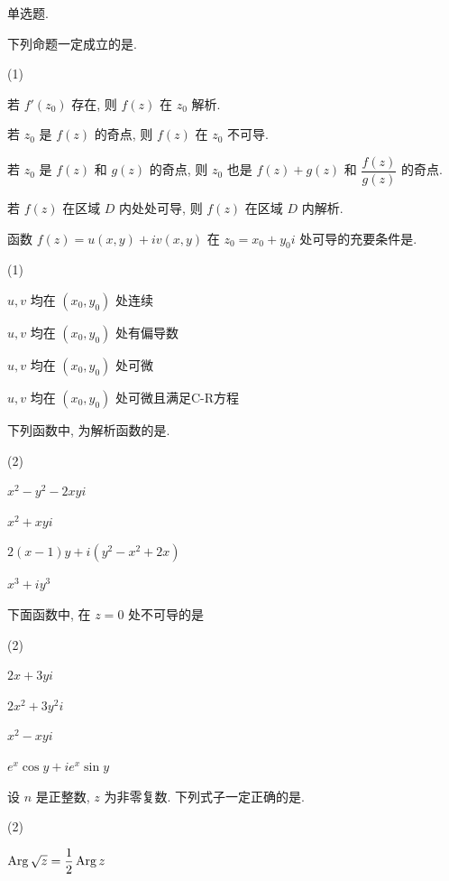 \sectionHomework
\begin{homework}
  \item 单选题.
  \begin{subex}
    \item 下列命题一定成立的是\fillbrace{}.
    \begin{exchoice}(1)
      \item 若 $f'(z_0)$ 存在, 则 $f(z)$ 在 $z_0$ 解析.
      \item 若 $z_0$ 是 $f(z)$ 的奇点, 则 $f(z)$ 在 $z_0$ 不可导.
      \item 若 $z_0$ 是 $f(z)$ 和 $g(z)$ 的奇点, 则 $z_0$ 也是 $f(z)+g(z)$ 和 $\dfrac{f(z)}{g(z)}$ 的奇点.
      \item 若 $f(z)$ 在区域 $D$ 内处处可导, 则 $f(z)$ 在区域 $D$ 内解析.
    \end{exchoice}
    \item 函数 $f(z)=u(x,y)+iv(x,y)$ 在 $z_0=x_0+y_0i$ 处可导的充要条件是\fillbrace{}.
    \begin{exchoice}(1)
      \item $u,v$ 均在 $(x_0,y_0)$ 处连续
      \item $u,v$ 均在 $(x_0,y_0)$ 处有偏导数
      \item $u,v$ 均在 $(x_0,y_0)$ 处可微
      \item $u,v$ 均在 $(x_0,y_0)$ 处可微且满足C-R方程
    \end{exchoice}
    \item 下列函数中, 为解析函数的是\fillbrace{}.
    \begin{exchoice}(2)
      \item $x^2-y^2-2xyi$
      \item $x^2+xyi$
      \item $2(x-1)y+i(y^2-x^2+2x)$
      \item $x^3+iy^3$
    \end{exchoice}
    \item 下面函数中, 在 $z=0$ 处不可导的是\fillbrace{}
    \begin{exchoice}(2)
      \item $2x+3yi$
      \item $2x^2+3y^2i$
      \item $x^2-xyi$
      \item $e^x\cos y+i e^x\sin y$
    \end{exchoice}
    \item 设 $n$ 是正整数, $z$ 为非零复数. 下列式子一定正确的是\fillbrace{}.
    \begin{exchoice}(2)
      \item $\operatorname{Arg} \sqrt z=\dfrac12\operatorname{Arg} z$

\end{exchoice}
\end{subex}
\end{homework}

